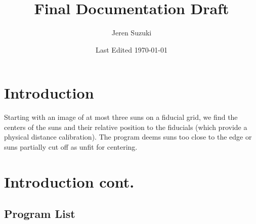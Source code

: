 \documentclass[10pt]{scrartcl}
\title{Final Documentation Draft}
\author{Jeren Suzuki}
\date{Last Edited \today}
\begin{document}
\maketitle
{}
\tableofcontents
\clearpage
{}

\section{Introduction} %
\label{sec:introduction}
Starting with an image of at most three suns on a fiducial grid, we find the centers of the suns and their relative position to the fiducials (which provide a physical distance calibration). The program deems suns too close to the edge or suns partially cut off as unfit for centering. 

\section{Introduction cont.} %
\label{sec:intro_cont}

%
%
%
%
%

\subsection{Program List} %
\label{sub:program_list}
\end{document}
